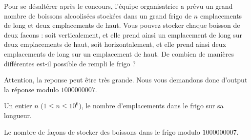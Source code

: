 \problemname{\problemyamlname}


Pour se désaltérer après le concours, l'équipe organisatrice a prévu un grand
nombre de boissons alcoolisées stockées dans un grand frigo de $n$ emplacements
de long et deux emplacements de haut. Vous pouvez stocker chaque boisson de
deux facons : soit verticalement, et elle prend ainsi un emplacement de long sur
deux emplacements de haut, soit horizontalement, et elle prend ainsi deux
emplacements de long sur un emplacement de haut. De combien de manières
différentes est-il possible de rempli le frigo ? 

Attention, la reponse peut être très grande. Nous vous demandons donc d'output
la réponse modulo $1000000007$.

\begin{Input}
	Un entier $n$ ($1 \le n \le 10^6$), le nombre d'emplacements dans le frigo sur sa longueur.
\end{Input}

\begin{Output}
	Le nombre de façons de stocker des boissons dans le frigo modulo $1000000007$.
\end{Output}
